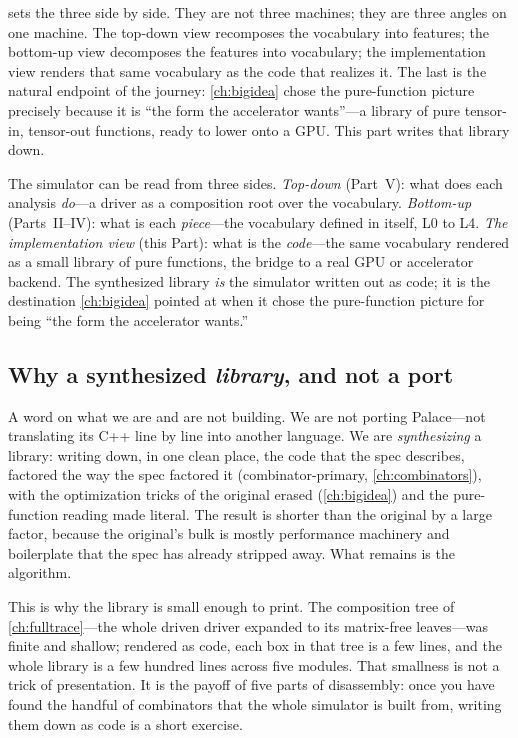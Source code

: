  sets the three side by side. They are not three machines;
they are three angles on one machine. The top-down view recomposes the vocabulary
into features; the bottom-up view decomposes the features into vocabulary; the
implementation view renders that same vocabulary as the code that realizes it. The
last is the natural endpoint of the journey: \cref{ch:bigidea} chose the
pure-function picture precisely because it is ``the form the accelerator wants''---a
library of pure tensor-in, tensor-out functions, ready to lower onto a GPU. This
part writes that library down.

\begin{keyidea}
The simulator can be read from three sides. \emph{Top-down} (Part~V): what does each
analysis \emph{do}---a driver as a composition root over the vocabulary.
\emph{Bottom-up} (Parts~II--IV): what is each \emph{piece}---the vocabulary defined
in itself, L0 to L4. \emph{The implementation view} (this Part): what is the
\emph{code}---the same vocabulary rendered as a small library of pure functions, the
bridge to a real GPU or accelerator backend. The synthesized library \emph{is} the
simulator written out as code; it is the destination \cref{ch:bigidea} pointed at
when it chose the pure-function picture for being ``the form the accelerator wants.''
\end{keyidea}

\subsection{Why a synthesized \emph{library}, and not a port}

A word on what we are and are not building. We are not porting Palace---not
translating its C++ line by line into another language. We are \emph{synthesizing}
a library: writing down, in one clean place, the code that the spec describes,
factored the way the spec factored it (combinator-primary, \cref{ch:combinators}),
with the optimization tricks of the original erased (\cref{ch:bigidea}) and the
pure-function reading made literal. The result is shorter than the original by a
large factor, because the original's bulk is mostly performance machinery and
boilerplate that the spec has already stripped away. What remains is the algorithm.

This is why the library is small enough to print. The composition tree of
\cref{ch:fulltrace}---the whole driven driver expanded to its matrix-free
leaves---was finite and shallow; rendered as code, each box in that tree is a few
lines, and the whole library is a few hundred lines across five modules. That
smallness is not a trick of presentation. It is the payoff of five parts of
disassembly: once you have found the handful of combinators that the whole
simulator is built from, writing them down as code is a short exercise.


